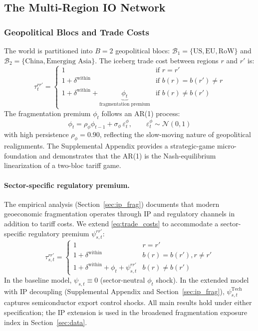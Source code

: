 \subsection{The Multi-Region IO Network}
\label{sec:io_network}

\subsubsection{Geopolitical Blocs and Trade Costs}

The world is partitioned into $B = 2$ geopolitical blocs:
$\mathcal{B}_1 = \{\text{US}, \text{EU}, \text{RoW}\}$ and
$\mathcal{B}_2 = \{\text{China}, \text{Emerging Asia}\}$. The iceberg trade
cost between regions $r$ and $r'$ is:
\begin{equation}
  \tau_t^{rr'} = \begin{cases}
    1 & \text{if } r = r' \\
    1 + \delta^{\text{within}} & \text{if } b(r) = b(r') \neq r \\
    1 + \delta^{\text{within}} + \underbrace{\phi_t}_{\text{fragmentation premium}}
      & \text{if } b(r) \neq b(r')
  \end{cases}
  \label{eq:trade_costs}
\end{equation}
The fragmentation premium $\phi_t$ follows an AR(1) process:
\begin{equation}
  \phi_t = \rho_\phi \phi_{t-1} + \sigma_\phi\,\varepsilon_t^\phi,
  \qquad \varepsilon_t^\phi \sim \mathcal{N}(0,1)
  \label{eq:phi_process}
\end{equation}
with high persistence $\rho_\phi = 0.90$, reflecting the slow-moving nature
of geopolitical realignments. The Supplemental Appendix provides a
strategic-game micro-foundation and demonstrates that the AR(1) is the
Nash-equilibrium linearization of a two-bloc tariff game.

\paragraph{Sector-specific regulatory premium.}
The empirical analysis (Section~\ref{sec:ip_frag}) documents that modern
geoeconomic fragmentation operates through IP and regulatory channels in
addition to tariff costs. We extend \eqref{eq:trade_costs} to accommodate
a sector-specific regulatory premium $\psi_{s,t}^{rr'}$:
\begin{equation}
  \tau_{s,t}^{rr'} = \begin{cases}
    1 & r = r' \\
    1 + \delta^{\text{within}} & b(r)=b(r'), r\neq r' \\
    1 + \delta^{\text{within}} + \phi_t + \psi_{s,t}^{rr'} & b(r)\neq b(r')
  \end{cases}
  \label{eq:trade_costs_full}
\end{equation}
In the baseline model, $\psi_{s,t} \equiv 0$ (sector-neutral $\phi_t$ shock).
In the extended model with IP decoupling (Supplemental Appendix
and Section~\ref{sec:ip_frag}), $\psi_{s,t}^{\text{Tech}}$ captures
semiconductor export control shocks. All main results hold under either
specification; the IP extension is used in the broadened fragmentation
exposure index in Section~\ref{sec:data}.

